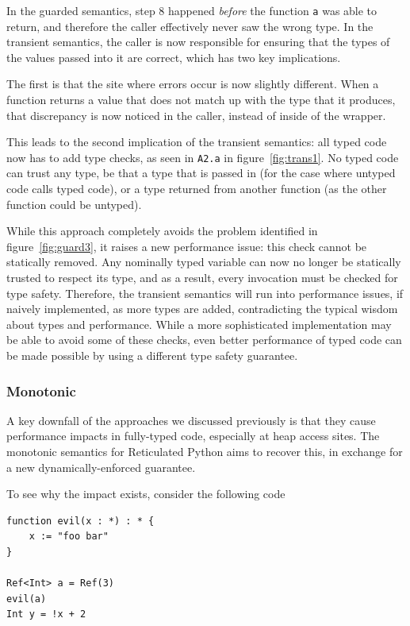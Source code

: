 \documentclass[a4paper,USenglish]{tex/lipics-v2016}
\begin{document}
In the guarded semantics, step 8 happened \emph{before} the function
\verb|a| was able to return, and therefore the caller effectively never saw
the wrong type. In the transient semantics, the caller is now responsible
for ensuring that the types of the values passed into it are correct, which
has two key implications.

The first is that the site where errors occur is now slightly
different. When a function returns a value that does not match up with the
type that it produces, that discrepancy is now noticed in the caller,
instead of inside of the wrapper.

This leads to the second implication of the transient semantics: all typed
code now has to add type checks, as seen in \verb|A2.a| in
figure~\ref{fig:trans1}. No typed code can trust any type, be that a type
that is passed in (for the case where untyped code calls typed code), or a
type returned from another function (as the other function could be
untyped).

While this approach completely avoids the problem identified in
figure~\ref{fig:guard3}, it raises a new performance issue: this check
cannot be statically removed. Any nominally typed variable can now no longer
be statically trusted to respect its type, and as a result, every invocation
must be checked for type safety. Therefore, the transient semantics will run
into performance issues, if naively implemented, as more types are added,
contradicting the typical wisdom about types and performance. While a more
sophisticated implementation may be able to avoid some of these checks, even
better performance of typed code can be made possible by using a different
type safety guarantee.

\subsubsection{Monotonic}
A key downfall of the approaches we discussed previously is that they
cause performance impacts in fully-typed code, especially at heap access
sites. The monotonic semantics for Reticulated Python aims to recover this,
in exchange for a new dynamically-enforced guarantee.

To see why the impact exists, consider the following code

\begin{verbatim}
function evil(x : *) : * {
	x := "foo bar"
}

Ref<Int> a = Ref(3)
evil(a)
Int y = !x + 2
\end{verbatim}
\end{document}
